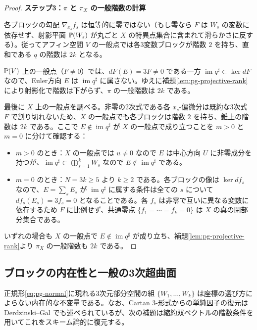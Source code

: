 \begin{proof}
\par\medskip\noindent\textbf{ステップ3：$\pi$ と $\pi_X$ の一般階数の計算}\par\nobreak\smallskip
各ブロックの勾配 $\nabla_{x_s}f_s$ は恒等的に零ではない（もし零なら $F$ は $W_s$ の変数に依存せず、射影平面 $\mathbb P(W_s)$ が丸ごと $X$ の特異点集合に含まれて滑らかさに反する）。従ってアフィン空間 $V$ の一般点では各3変数ブロックが階数 $2$ を持ち、直和である $q$ の階数は $2k$ となる。

$\mathbb P(V)$ 上の一般点（$F\ne0$）では、$dF(E)=3F\ne0$ である一方 $\operatorname{im}q^\sharp\subset\ker dF$ なので、Euler方向 $E$ は $\operatorname{im}q^\sharp$ に属さない。ゆえに補題\ref{lem:pg-projective-rank}により射影化で階数は下がらず、$\pi$ の一般階数は $2k$ である。

最後に $X$ 上の一般点を調べる。非零の2次式である各 $x_s$-偏微分は既約な3次式 $F$ で割り切れないため、$X$ の一般点でも各ブロックは階数 $2$ を持ち、錐上の階数は $2k$ である。ここで $E\notin\operatorname{im}q^\sharp$ が $X$ の一般点で成り立つことを $m>0$ と $m=0$ に分けて確認する：
\begin{itemize}
  \item $m>0$ のとき：$X$ の一般点では $u\ne0$ なので $E$ は中心方向 $U$ に非零成分を持つが、$\operatorname{im}q^\sharp\subset\bigoplus_{s=1}^k W_s$ なので $E\notin\operatorname{im}q^\sharp$ である。
  \item $m=0$ のとき：$N=3k\ge5$ より $k\ge2$ である。各ブロックの像は $\ker df_s$ なので、$E=\sum_s E_s$ が $\operatorname{im}q^\sharp$ に属する条件は全ての $s$ について $df_s(E_s)=3f_s=0$ となることである。各 $f_s$ は非零で互いに異なる変数に依存するため $F$ に比例せず、共通零点 $\{f_1=\cdots=f_k=0\}$ は $X$ の真の閉部分集合である。
\end{itemize}
いずれの場合も $X$ の一般点で $E\notin\operatorname{im}q^\sharp$ が成り立ち、補題\ref{lem:pg-projective-rank}より $\pi_X$ の一般階数も $2k$ である。
\end{proof}

\subsection{ブロックの内在性と一般の3次超曲面}
正規形\eqref{eq:pg-normal}に現れる3次元部分空間の組 $\{W_1,\ldots,W_k\}$ は座標の選び方によらない内在的な不変量である。なお、Cartan 3-形式からの単純因子の復元はDerdzinski--Gal \cite[Lemma~7.1(a)]{PDerdzinskiGal} でも述べられているが、次の補題は縮約双ベクトルの階数条件を用いてこれをスキーム論的に復元する。

